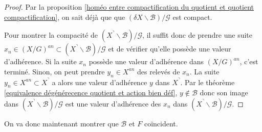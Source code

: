 \documentclass[11pt]{article}
\newcommand{\C}{\mathbb{C}}
\newtheorem{rem}[thm]{Remarque}
\begin{document}
\begin{proof}
Par la proposition \ref{homéo entre compactification du quotient et quotient compactification}, on sait déjà que que $(\delta X \backslash \mathcal{B})/\mathcal{G}$ est compact. 

Pour montrer la compacité de $(X^\urcorner \backslash \mathcal{B})/\mathcal{G}$, il suffit donc de prendre une suite $x_n \in (X/G)^{an} \subset(X^\urcorner \backslash \mathcal{B})/\mathcal{G}$ et de vérifier qu'elle possède une valeur d'adhérence. Si la suite $x_n$ possède une valeur d'adhérence dans $(X/G)^{an}$, c'est terminé. Sinon, on peut prendre $y_n \in X^{an}$ des relevés de $x_n$. La suite $y_n \in X^{an} \subset X^\urcorner$ a alors une valeur d'adhérence $y$ dans $X^\urcorner$. Par le théorème \ref{equivalence dégénérecence quotient et action bien déf}, $y \notin \mathcal{B}$ donc son image dans $(X^\urcorner \backslash \mathcal{B})/\mathcal{G}$ est une valeur d'adhérence des $x_n$ dans $(X^\urcorner \backslash \mathcal{B})/\mathcal{G}$.
\end{proof}

On va donc maintenant montrer que $\mathcal{B}$ et $F$ coïncident.

\end{document}
